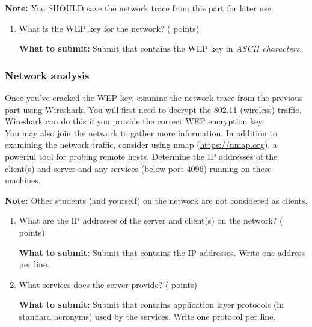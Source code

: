 \textbf{Note:} You SHOULD save the network trace from this part for later use.

\begin{enumerate}
  \item \hypertarget{cp2wep}{What is the WEP key for the network? ( points)} \label{itm:wep}

    \textbf{What to submit:} Submit
      \texttt{\hyperlink{wepformat}{\filewep}} that contains the WEP key in \textit{ASCII characters}.
\end{enumerate}

\subsubsection*{Network analysis}
Once you've cracked the WEP key, examine the network trace from the previous part using Wireshark.
You will first need to decrypt the 802.11 (wireless) traffic.
Wireshark can do this if you provide the correct WEP encryption key.\\
You may also join the network to gather more information.
In addition to examining the network traffic, consider using nmap (\url{https://nmap.org}), a powerful tool for probing remote hosts.
Determine the IP addresses of the client(s) and server and any services (below port 4096) running on these machines.

\textbf{Note:} Other students (and yourself) on the network are not considered as clients.

\begin{enumerate}[resume]
  \item \hypertarget{cp2wifiip}{What are the IP addresses of the server and client(s) on the network? ( points)} \label{itm:wifiip}

    \textbf{What to submit:} Submit
      \texttt{\hyperlink{wifiipformat}{\filewifiip}} that contains the IP addresses.
      Write one address per line.

  \item \hypertarget{cp2protocol}{What services does the server provide? ( points)} \label{itm:protocol}

    \textbf{What to submit:} Submit
      \texttt{\hyperlink{protocolformat}{\fileprotocol}} that contains application layer protocols (in standard acronyms) used by the services.
      Write one protocol per line.

\end{enumerate}

